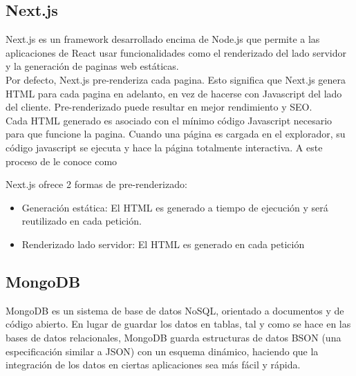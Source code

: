         
        
    \subsection{Next.js}

        Next.js es un framework desarrollado encima de Node.js que permite a las aplicaciones de React usar funcionalidades como el renderizado del lado servidor y la generación de paginas web estáticas.\\

        Por defecto, Next.js pre-renderiza cada pagina. Esto significa que Next.js genera HTML para cada pagina en adelanto, en vez de hacerse con Javascript del lado del cliente. Pre-renderizado puede resultar en mejor rendimiento y SEO.\\

        Cada HTML generado es asociado con el mínimo código Javascript necesario para que funcione la pagina. Cuando una página es cargada en el explorador, su código javascript se ejecuta y hace la página totalmente interactiva. A este proceso de le conoce como 

        Next.js ofrece 2 formas de pre-renderizado: 

        \begin{itemize}
            \item Generación estática: El HTML es generado a tiempo de ejecución y será reutilizado en cada petición.
            \item Renderizado lado servidor: El HTML es generado en cada petición
        \end{itemize}

    \subsection{MongoDB}

        MongoDB es un sistema de base de datos NoSQL, orientado a documentos y de código abierto. En lugar de guardar los datos en tablas, tal y como se hace en las bases de datos relacionales, MongoDB guarda estructuras de datos BSON (una especificación similar a JSON) con un esquema dinámico, haciendo que la integración de los datos en ciertas aplicaciones sea más fácil y rápida.

        \iffalse 
            \begin{figure}
                \texttt{[image: mongodb-structure.jpg]}
                \caption{Comparación de estructura de datos entre MongoDB y los RDBMS (sistema de gestión de bases de datos relacionales)}
            \end{figure}
        \fi


